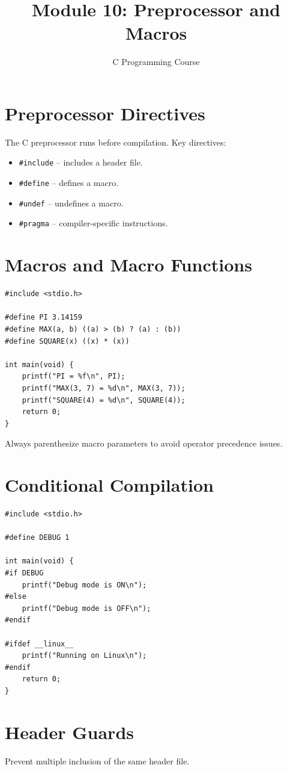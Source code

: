 \documentclass[11pt,a4paper]{article}
\title{Module 10: Preprocessor and Macros}
\author{C Programming Course}
\date{}
\begin{document}
\maketitle
\thispagestyle{fancy}

\section{Preprocessor Directives}
The C preprocessor runs before compilation. Key directives:
\begin{itemize}
  \item \texttt{\#include} -- includes a header file.
  \item \texttt{\#define} -- defines a macro.
  \item \texttt{\#undef} -- undefines a macro.
  \item \texttt{\#pragma} -- compiler-specific instructions.
\end{itemize}

\section{Macros and Macro Functions}
\begin{lstlisting}
#include <stdio.h>

#define PI 3.14159
#define MAX(a, b) ((a) > (b) ? (a) : (b))
#define SQUARE(x) ((x) * (x))

int main(void) {
    printf("PI = %f\n", PI);
    printf("MAX(3, 7) = %d\n", MAX(3, 7));
    printf("SQUARE(4) = %d\n", SQUARE(4));
    return 0;
}
\end{lstlisting}

Always parenthesize macro parameters to avoid operator precedence issues.

\section{Conditional Compilation}
\begin{lstlisting}
#include <stdio.h>

#define DEBUG 1

int main(void) {
#if DEBUG
    printf("Debug mode is ON\n");
#else
    printf("Debug mode is OFF\n");
#endif

#ifdef __linux__
    printf("Running on Linux\n");
#endif
    return 0;
}
\end{lstlisting}

\section{Header Guards}
Prevent multiple inclusion of the same header file.
\end{document}
